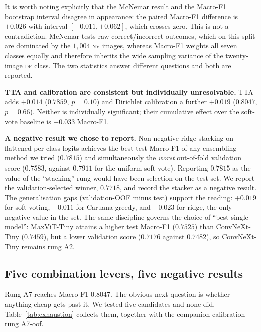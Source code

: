 \documentclass[journal]{IEEEtran}
\begin{document}
It is worth noting explicitly that the McNemar result and the Macro-F1 bootstrap interval
disagree in appearance: the paired Macro-F1 difference is $+0.026$ with interval
$[-0.011, +0.062]$, which crosses zero. This is not a contradiction. McNemar tests raw
correct/incorrect outcomes, which on this split are dominated by the $1{,}004$ \textsc{nv}
images, whereas Macro-F1 weights all seven classes equally and therefore inherits the wide
sampling variance of the twenty-image \textsc{df} class. The two statistics answer different
questions and both are reported.

\textbf{TTA and calibration are consistent but individually unresolvable.} TTA adds $+0.014$
($0.7859$, $p=0.10$) and Dirichlet calibration a further $+0.019$ ($0.8047$, $p=0.66$).
Neither is individually significant; their cumulative effect over the soft-vote baseline is
$+0.033$ Macro-F1.

\textbf{A negative result we chose to report.} Non-negative ridge stacking on flattened
per-class logits achieves the best test Macro-F1 of any ensembling method we tried
($0.7815$) and simultaneously the \emph{worst} out-of-fold validation score
($0.7583$, against $0.7911$ for the uniform soft-vote). Reporting $0.7815$ as the value of
the ``stacking'' rung would have been selection on the test set. We report the
validation-selected winner, $0.7718$, and record the stacker as a negative result. The
generalisation gaps (validation-OOF minus test) support the reading: $+0.019$ for
soft-voting, $+0.011$ for Caruana greedy, and $-0.023$ for ridge, the only negative value in
the set. The same discipline governs the choice of ``best single model'': MaxViT-Tiny attains
a higher test Macro-F1 ($0.7525$) than ConvNeXt-Tiny ($0.7459$), but a lower validation score
($0.7176$ against $0.7482$), so ConvNeXt-Tiny remains rung A2.

\subsection{Five combination levers, five negative results}
\label{sec:results-exhaustion}

Rung A7 reaches Macro-F1 $0.8047$. The obvious next question is whether anything cheap gets
past it. We tested five candidates and none did. Table~\ref{tab:exhaustion} collects them,
together with the companion calibration rung A7-oof.
\end{document}
